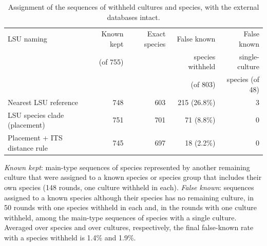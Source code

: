 \begin{table}[htbp]\centering
\begin{threeparttable}
\caption{Assignment of the sequences of withheld cultures and species, with the external databases intact.}
\label{tab:benchmark}
\footnotesize\setlength{\tabcolsep}{4pt}
\begin{tabular}{lrrrr}
\toprule
LSU naming & Known kept & Exact species & False known & False known\\
 & (of 755) & & species withheld & single-culture\\
 & & & (of 803) & species (of 48)\\
\midrule
Nearest LSU reference & 748 & 603 & 215 (26.8\%) & 3\\
LSU species clade (placement) & 751 & 701 & 71 (8.8\%) & 0\\
Placement + ITS distance rule & 745 & 697 & 18 (2.2\%) & 0\\
\bottomrule
\end{tabular}
\begin{tablenotes}\footnotesize
\item \emph{Known kept}: main-type sequences of species represented by another remaining culture that were
assigned to a known species or species group that includes their own species (148 rounds, one culture withheld in
each). \emph{False known}: sequences assigned to a known species although their species has no remaining culture,
in 50 rounds with one species withheld in each and, in the rounds with one culture withheld, among the main-type
sequences of species with a single culture. Averaged over species and over cultures, respectively, the final
false-known rate with a species withheld is 1.4\% and 1.9\%.
\end{tablenotes}
\end{threeparttable}
\end{table}
